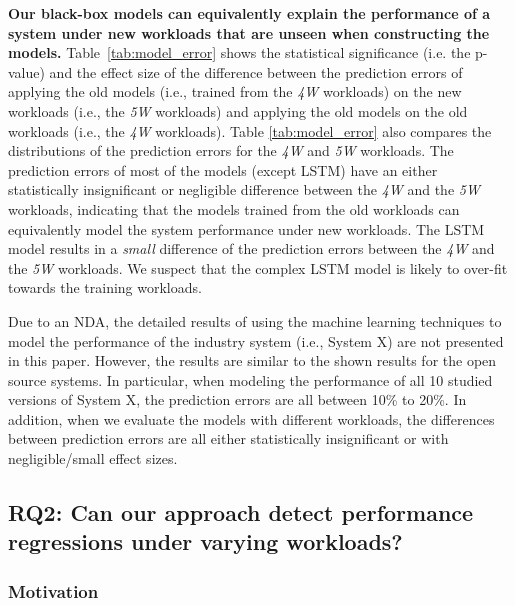 \noindent\textbf{Our black-box models can equivalently explain the performance of a system under new workloads that are unseen when constructing the models.}
Table~\ref{tab:model_error} shows the statistical significance (i.e. the p-value) and the effect size of the difference between the prediction errors of applying the old models (i.e., trained from the \emph{4W} workloads) on the new workloads (i.e., the \emph{5W} workloads) and applying the old models on the old workloads (i.e., the \emph{4W} workloads). 
Table \ref{tab:model_error} also compares the distributions of the prediction errors for the \emph{4W} and \emph{5W} workloads.
The prediction errors of most of the models (except LSTM) have an either statistically insignificant or negligible difference between the \emph{4W} and the \emph{5W} workloads, indicating that the models trained from the old workloads can equivalently model the system performance under new workloads.
The LSTM model results in a \emph{small} difference of the prediction errors between the \emph{4W} and the \emph{5W} workloads. We suspect that the complex LSTM model is likely to over-fit towards the training workloads.

Due to an NDA, the detailed results of using the machine learning techniques to model the performance of the industry system (i.e., System X) are not presented in this paper. However, the results are similar to the shown results for the open source systems. In particular, when modeling the performance of all 10 studied versions of System X, the prediction errors are all between 10\% to 20\%. In addition, when we evaluate the models with different workloads, the differences between prediction errors are all either statistically insignificant or with negligible/small effect sizes.




\subsection*{RQ2: Can our approach detect performance regressions under varying workloads?}

\subsubsection*{Motivation}

